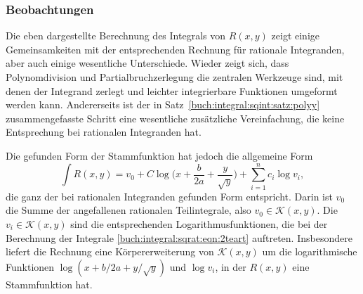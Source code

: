 \subsubsection{Beobachtungen}
Die eben dargestellte Berechnung des Integrals von $R(x,y)$ zeigt einige
Gemeinsamkeiten mit der entsprechenden Rechnung für rationale
Integranden, aber auch einige wesentliche Unterschiede.
Wieder zeigt sich, dass Polynomdivision und Partialbruchzerlegung
die zentralen Werkzeuge sind, mit denen der Integrand zerlegt und
leichter integrierbare Funktionen umgeformt werden kann.
Andererseits ist der in 
Satz~\ref{buch:integral:sqint:satz:polyy}
zusammengefasste Schritt eine wesentliche zusätzliche Vereinfachung,
die keine Entsprechung bei rationalen Integranden hat.

Die gefunden Form der Stammfunktion hat jedoch die allgemeine
Form
\[
\int R(x,y)
=
v_0 +
C
\log\biggl(x+\frac{b}{2a}+\frac{y}{\sqrt{y}}\biggr)
+
\sum_{i=1}^n c_i
\log v_i,
\]
die ganz der bei rationalen Integranden gefunden Form entspricht.
Darin ist $v_0$ die Summe der angefallenen rationalen Teilintegrale,
also $v_0\in\mathcal{K}(x,y)$.
Die $v_i\in\mathcal{K}(x,y)$ sind die entsprechenden Logarithmusfunktionen,
die bei der Berechnung der Integrale \eqref{buch:integral:sqrat:eqn:2teart}
auftreten.
Insbesondere liefert die Rechnung eine Körpererweiterung von
$\mathcal{K}(x,y)$ um die logarithmische Funktionen
$\log(x+b/2a+y/\sqrt{y})$ und $\log v_i$, in der $R(x,y)$ eine
Stammfunktion hat.




